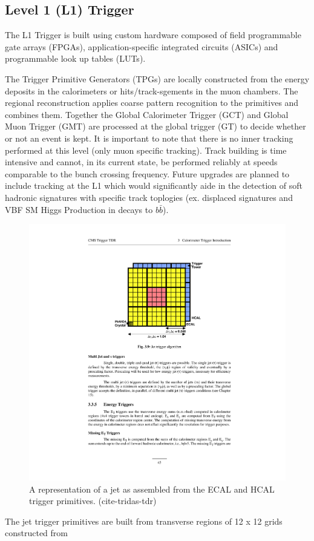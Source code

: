 {\subsection{Level 1 (L1) Trigger}

The L1 Trigger is built using custom hardware composed of field programmable gate arrays (FPGAs), 
application-specific integrated circuits (ASICs) and programmable look up tables (LUTs). 

The Trigger Primitive Generators (TPGs) are locally constructed from the energy deposits in the calorimeters or
hits/track-sgements in the muon chambers. The regional reconstruction applies coarse pattern
 recognition to the primitives and combines them. Together the  Global Calorimeter Trigger (GCT)
 and Global Muon Trigger (GMT) are processed at the global trigger (GT) to decide whether or
 not an event is kept. It is important to note that there is no inner tracking performed at this
 level (only muon specific tracking). Track building is time intensive and cannot, in its current
 state, be performed reliably at speeds comparable to the bunch crossing frequency. 
Future upgrades are planned to include tracking at the L1 which would significantly aide in
 the detection of soft hadronic signatures with specific track toplogies (ex. displaced signatures and VBF SM Higgs Production in decays to $b\bar{b}$). 

\begin{figure}
\begin{center}
\includegraphics[width=.55\textwidth]{pics/jet_trigger_tower}
\caption{A  representation of a jet as assembled from the ECAL and HCAL trigger primitives. (cite-tridas-tdr)}
\end{center}
\label{fig:jet_trigger_tower}
\end{figure}

The jet trigger primitives are built from transverse regions of 12 x 12 grids constructed from 

}
